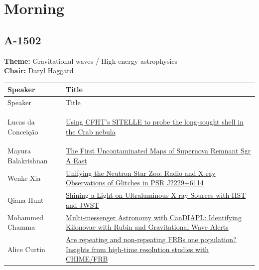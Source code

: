 \hypertarget{schedule-day-tuesday}{}

\hypertarget{schedule-tuesday-morning}{}
\section*{Morning}

\hypertarget{schedule-tuesday-morning-a-1502}{}
\subsection*{A-1502}
\textbf{Theme:} Gravitational waves / High energy astrophysics\\
\textbf{Chair:} Daryl Haggard\\
{\small
{}
\sloppy
\setlength{\emergencystretch}{1em}
\begin{longtable}{@{}>{\TableRaggedRight\arraybackslash\hspace{0pt}}p{} >{\TableRaggedRight\arraybackslash\hspace{0pt}}p{}@{}}
\toprule
Speaker & Title \\
\midrule
\endfirsthead
\toprule
Speaker & Title \\
\midrule
\endhead
\hypertarget{schedule-talk-283}{}\label{schedule-page-talk-283}Lucas da Conceição & \hyperlink{abstract-talk-283}{Using CFHT's SITELLE to probe the long-sought shell in the Crab nebula} \\
\hypertarget{schedule-talk-13}{}\label{schedule-page-talk-13}Mayura Balakrishnan & \hyperlink{abstract-talk-13}{The First Uncontaminated Maps of Supernova Remnant Sgr A East} \\
\hypertarget{schedule-talk-248}{}\label{schedule-page-talk-248}Wenke Xia & \hyperlink{abstract-talk-248}{Unifying the Neutron Star Zoo: Radio and X-ray Observations of Glitches in PSR J2229+6114} \\
\hypertarget{schedule-talk-117}{}\label{schedule-page-talk-117}Qiana Hunt & \hyperlink{abstract-talk-117}{Shining a Light on Ultraluminous X-ray Sources with HST and JWST} \\
\hypertarget{schedule-talk-140}{}\label{schedule-page-talk-140}Mohammed Chamma & \hyperlink{abstract-talk-140}{Multi-messenger Astronomy with CanDIAPL: Identifying Kilonovae with Rubin and Gravitational Wave Alerts} \\
\hypertarget{schedule-talk-134}{}\label{schedule-page-talk-134}Alice Curtin & \hyperlink{abstract-talk-134}{Are repeating and non-repeating FRBs one population? Insights from high-time resolution studies with CHIME/FRB} \\
\bottomrule
\end{longtable}
}

